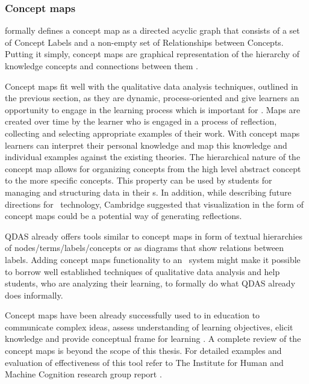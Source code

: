 \subsubsection{Concept maps}

\citet{Mcaleese1998} formally defines a concept map as a directed acyclic graph
that consists of a set of Concept Labels and a non-empty set of Relationships
between Concepts. Putting it simply, concept maps are graphical representation
of the hierarchy of knowledge concepts and connections between them
\citep{Novak2008}.

Concept maps fit well with the qualitative data analysis techniques, outlined in
the previous section, as they are dynamic, process-oriented and give learners an
opportunity to engage in the learning process \citep{Mcaleese1998} which is
important for \LLLs \citep{Schuetze2006,Divjak2004}. Maps are created over time
by the learner who is engaged in a process of reflection, collecting and
selecting appropriate examples of their work. With concept maps learners can
interpret their personal knowledge and map this knowledge and individual
examples against the existing theories. The hierarchical nature of the concept
map allows for organizing concepts from the high level abstract concept to the
more specific concepts. This property can be used by students for managing and
structuring data in their \ep s. In addition, while describing future directions
for \ep~technology, Cambridge \citeyearpar{Cambridge2010} suggested that
visualization in the form of concept maps could be a potential way of generating
reflections.

QDAS already offers tools similar to concept maps in form of textual hierarchies
of nodes/terms/labels/concepts or as diagrams that show relations between
labels. Adding concept maps functionality to an \ep~system might make it
possible to borrow well established techniques of qualitative data analysis and
help students, who are analyzing their learning, to formally do what QDAS
already does informally. 

Concept maps have been already successfully used to in education to communicate
complex ideas, assess understanding of learning objectives, elicit knowledge and
provide conceptual frame for learning \citep{Novak2010}. A complete review of
the concept maps is beyond the scope of this thesis. For detailed examples and
evaluation of effectiveness of this tool refer to The Institute for Human and
Machine Cognition research group report \citep{Canas2003}.

